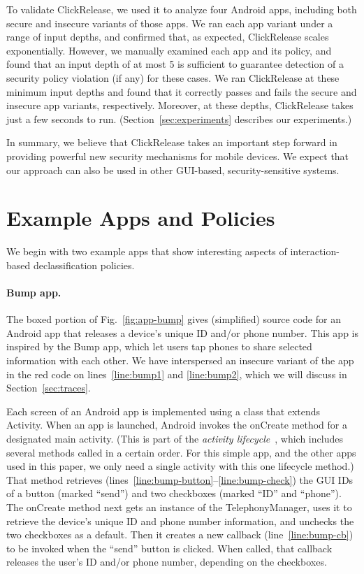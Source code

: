 \documentclass{llncs}
\newcommand{\code}[1]{\textsf{#1}} \newcommand{\bcode}[1]{\texttt{#1}}
\newcommand{\toolname}{ClickRelease\xspace}
\begin{document}
To validate \toolname, we used it to analyze four Android apps,
including both secure and insecure variants of those apps.
We ran each app variant under a range of input depths, and confirmed
that, as expected, \toolname{} scales exponentially.
However, we manually examined each app and its policy, and
found that an input depth of at most 5 is sufficient to
guarantee detection of a security policy violation (if any) for these
cases.  We ran \toolname{} at these minimum input depths and found
that it correctly passes and fails the secure and insecure app
variants, respectively. Moreover, at these depths, \toolname{} takes just a few
seconds to run. (Section~\ref{sec:experiments} describes our experiments.)

In summary, we believe that \toolname takes an important step forward
in providing powerful new security mechanisms for mobile devices. We
expect that our approach can also be used in other
GUI-based, security-sensitive systems.

\section{Example Apps and Policies}
\label{sec:overview}

We begin with two example apps that show interesting aspects of
interaction-based declassification
policies.

\paragraph*{Bump app.}

The boxed portion of Fig.~\ref{fig:app-bump} gives (simplified) source
code for an Android app that releases a device's unique ID and/or phone
number. This app is inspired by the Bump app, which let users tap
phones to share selected information with each other.  We have
interspersed an insecure variant of the app in the red code on
lines~\ref{line:bump1} and \ref{line:bump2}, which we will
discuss in Section~\ref{sec:traces}.

Each screen of an Android app is implemented using a class that
extends \code{Activity}. When an app is launched, Android invokes the
\code{onCreate} method for a designated main activity.
(This is part of the \emph{activity lifecycle}~\cite{Android:15},
which includes several methods called in a certain order. For this
simple app, and the other apps used in this paper, we only need a
single activity with this one lifecycle method.)
That method retrieves
(lines~\ref{line:bump-button}--\ref{line:bump-check}) the GUI IDs of a
button (marked ``send'') and
two checkboxes (marked ``ID'' and ``phone''). The \code{onCreate} method next
gets an instance of the \code{TelephonyManager}, uses it
to retrieve the device's unique ID and phone number information, and unchecks the two
checkboxes as a default. Then it creates a new callback
(line~\ref{line:bump-cb}) to be invoked when the ``send'' button is
clicked. When called, that callback releases the user's ID and/or
phone number, depending on the checkboxes.
\end{document}
